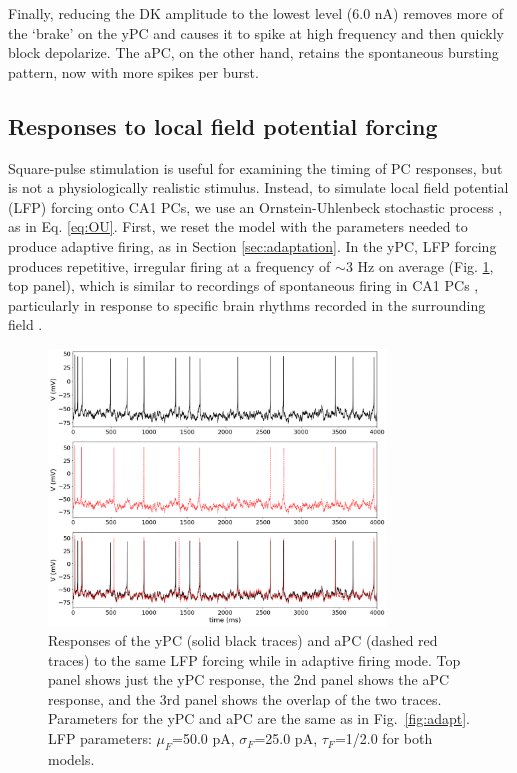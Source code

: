 \documentclass[12pt]{article}
\begin{document}
Finally, reducing the DK amplitude to the lowest level (6.0 nA) removes more of the `brake' on the yPC and causes it to spike at high frequency and then quickly block depolarize. The aPC, on the other hand, retains the spontaneous bursting pattern, now with more spikes per burst.

\subsection{Responses to local field potential forcing}
Square-pulse stimulation is useful for examining the timing of PC responses, but is not a physiologically realistic stimulus. Instead, to simulate local field potential (LFP) forcing onto CA1 PCs, we use an Ornstein-Uhlenbeck stochastic process \citep{rudolph2004method,destexhe2004novel}, as in Eq. \ref{eq:OU}. First, we reset the model with the parameters needed to produce adaptive firing, as in Section \ref{sec:adaptation}. In the yPC, LFP forcing produces repetitive, irregular firing at a frequency of $\sim$3 Hz on average (Fig. \ref{fig:LFPadaptive}, top panel), which is similar to recordings of spontaneous firing in CA1 PCs \citep{manseau2017tuning}, particularly in response to specific brain rhythms recorded in the surrounding field \citep{bland2005heterogeneity,huh2016excitatory}.

\begin{figure}[h!]
\centering
\includegraphics[width=0.8\textwidth]{figures/fig5.png}
\caption{Responses of the yPC (solid black traces) and aPC (dashed red traces) to the same LFP forcing while in adaptive firing mode. Top panel shows just the yPC response, the 2nd panel shows the aPC response, and the 3rd panel shows the overlap of the two traces. Parameters for the yPC and aPC are the same as in Fig.~\ref{fig:adapt}. LFP parameters: $\mu_{F}$=50.0 pA, $\sigma_{F}$=25.0 pA, $\tau_{F}$=1/2.0 for both models.}
\label{fig:LFPadaptive}
\end{figure}
\end{document}
